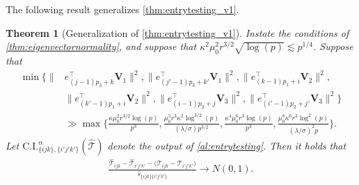 \documentclass[10pt]{article}
\newcommand{\0}{{\mathbf{0}}}
\newcommand{\1}{{\mathbf{1}}}
\renewcommand{\t}{^{\top}}
\newtheorem{theorem}{Theorem}
\renewcommand{\hat}{\widehat}
\renewcommand{\hat}{\widehat}
\begin{document}
\noindent The following result generalizes \cref{thm:entrytesting_v1}.  

\begin{theorem}[Generalization of \cref{thm:entrytesting_v1}]\label{thm:entrytesting}
Instate the conditions of \cref{thm:eigenvectornormality}, and suppose that $\kappa ^2 \mu_0^2 r^{3/2} \sqrt{\log(p)} \lesssim p^{1/4}$.  
Suppose that  \begin{align*}
 \min\bigg\{ \|& e_{(j-1)p_3 + k }\t \mathbf{V}_1\|^2, \| e_{(j'-1)p_3 + k'}\t \mathbf{V}_1\|^2, \| e_{(k-1)p_1 + i}\t \mathbf{V}_2 \|^2,\\
 &\| e_{(k'-1)p_1 + i}\t \mathbf{V}_2 \|^2, \| e_{(i-1)p_2 + j}\t \mathbf{V}_3 \|^2, \| e_{(i'-1)p_2 + j'}\t \mathbf{V}_3 \|^2 \bigg\} \\
    &\gg\max\bigg\{ \frac{\kappa \mu_0^2 r^{3/2} \log(p)}{p^3} , \frac{\mu_0^5 r^3 \kappa^2 \log^{3/2}(p)}{(\lambda/\sigma)p^{3/2}}, \frac{\kappa^4 \mu_0^6 r^3 \log(p)}{p^3}, \frac{\mu_0^8 \kappa^6 r^3 \log^2(p)}{(\lambda/\sigma)^2 p} \bigg\} .
    \end{align*} 
     Let $\mathrm{C.I.}^{\alpha}_{\{ijk\},\{i'j'k'\}}( \mathcal{\hat T}) $ denote the output of \cref{al:entrytesting}. 
Then it holds that
\begin{align*}
    \frac{\mathcal{\hat T}_{ijk} - \mathcal{\hat T}_{i'j'k'} - \big( \mathcal{T}_{ijk} - \mathcal{T}_{i'j'k'}\big)}{\hat s_{\{ijk\}\{i'j'k'\}}} \to N(0,1).
\end{align*}
\end{theorem}
\end{document}
